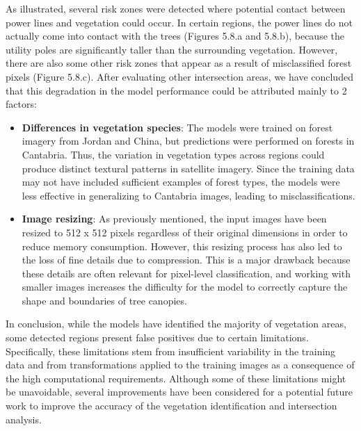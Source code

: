 As illustrated, several risk zones were detected where potential contact between power lines and vegetation could occur. In certain regions, the power lines do not actually come into contact with the trees (Figures 5.8.a and 5.8.b), because the utility poles are significantly taller than the surrounding vegetation. However, there are also some other risk zones that appear as a result of misclassified forest pixels (Figure 5.8.c). After evaluating other intersection areas, we have concluded that this degradation in the model performance could be attributed mainly to 2 factors: 

\begin{itemize}
    \item \textbf{Differences in vegetation species}: The models were trained on forest imagery from Jordan and China, but predictions were performed on forests in Cantabria. Thus, the variation in vegetation types across regions could produce distinct textural patterns in satellite imagery. Since the training data may not have included sufficient examples of forest types, the models were less effective in generalizing to Cantabria images, leading to misclassifications. 
    \item \textbf{Image resizing}: As previously mentioned, the input images have been resized to 512 x 512 pixels regardless of their original dimensions in order to reduce memory consumption. However, this resizing process has also led to the loss of fine details due to compression. This is a major drawback because these details are often relevant for pixel-level classification, and working with smaller images increases the difficulty for the model to correctly capture the shape and boundaries of tree canopies.  
\end{itemize}

In conclusion, while the models have identified the majority of vegetation areas, some detected regions present false positives due to certain limitations. Specifically, these limitations stem from insufficient variability in the training data and from transformations applied to the training images as a consequence of the high computational requirements. Although some of these limitations might be unavoidable, several improvements have been considered for a potential future work to improve the accuracy of the vegetation identification and intersection analysis. \\

